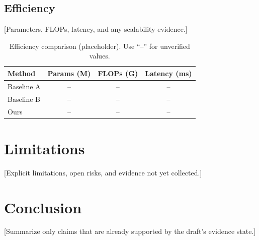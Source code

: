 \documentclass[conference]{IEEEtran}
\begin{document}
\subsection{Efficiency}
[Parameters, FLOPs, latency, and any scalability evidence.]

\begin{table}[t]
\centering
\caption{Efficiency comparison (placeholder). Use ``--'' for unverified values.}
\label{tab:efficiency}
\begin{tabular}{lccc}
\toprule
Method & Params (M) & FLOPs (G) & Latency (ms) \\
\midrule
Baseline A & -- & -- & -- \\
Baseline B & -- & -- & -- \\
Ours & -- & -- & -- \\
\bottomrule
\end{tabular}
\end{table}

\section{Limitations}
[Explicit limitations, open risks, and evidence not yet collected.]

\section{Conclusion}
[Summarize only claims that are already supported by the draft's evidence state.]

\label{ReferencesStart}


\end{document}
